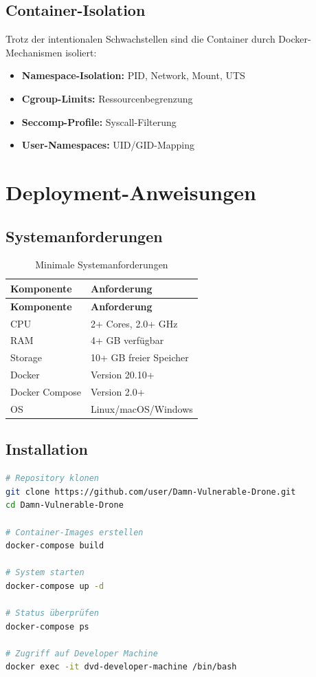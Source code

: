 \documentclass[11pt,a4paper]{article}
\begin{document}
\subsection{Container-Isolation}

Trotz der intentionalen Schwachstellen sind die Container durch Docker-Mechanismen isoliert:

\begin{itemize}
    \item \textbf{Namespace-Isolation:} PID, Network, Mount, UTS
    \item \textbf{Cgroup-Limits:} Ressourcenbegrenzung
    \item \textbf{Seccomp-Profile:} Syscall-Filterung
    \item \textbf{User-Namespaces:} UID/GID-Mapping
\end{itemize}

\section{Deployment-Anweisungen}

\subsection{Systemanforderungen}

\begin{longtable}{|l|l|}
\caption{Minimale Systemanforderungen} \\
\hline
\textbf{Komponente} & \textbf{Anforderung} \\
\hline
\endfirsthead
\hline
\textbf{Komponente} & \textbf{Anforderung} \\
\hline
\endhead
\hline
\endfoot
\hline
\endlastfoot

CPU & 2+ Cores, 2.0+ GHz \\
RAM & 4+ GB verfügbar \\
Storage & 10+ GB freier Speicher \\
Docker & Version 20.10+ \\
Docker Compose & Version 2.0+ \\
OS & Linux/macOS/Windows \\
\end{longtable}

\subsection{Installation}

\begin{lstlisting}[language=bash, caption=System-Deployment]
# Repository klonen
git clone https://github.com/user/Damn-Vulnerable-Drone.git
cd Damn-Vulnerable-Drone

# Container-Images erstellen
docker-compose build

# System starten
docker-compose up -d

# Status überprüfen
docker-compose ps

# Zugriff auf Developer Machine
docker exec -it dvd-developer-machine /bin/bash
\end{lstlisting}
\end{document}
